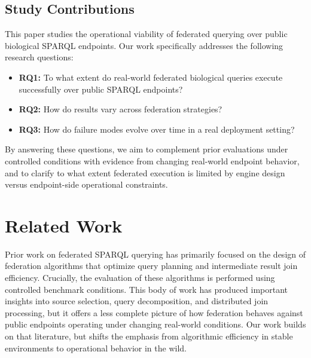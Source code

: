 \documentclass[runningheads]{llncs}
\begin{document}
\subsection{Study Contributions}\label{sec1.3}
This paper studies the operational viability of federated querying over public biological SPARQL endpoints. 
Our work specifically addresses the following research questions:

\begin{itemize}
    \item \textbf{RQ1:} To what extent do real-world federated biological queries execute successfully over public SPARQL endpoints?
    \item \textbf{RQ2:} How do results vary across federation strategies?
    \item \textbf{RQ3:} How do failure modes evolve over time in a real deployment setting?
\end{itemize}

By answering these questions, we aim to complement prior evaluations under controlled conditions with evidence from changing real-world endpoint behavior, and to clarify to what extent federated execution is limited by engine design versus endpoint-side operational constraints.


\section{Related Work}\label{sec2}
Prior work on federated SPARQL querying has primarily focused on the design of federation algorithms that optimize query planning and intermediate result join efficiency.
Crucially, the evaluation of these algorithms is performed using controlled benchmark conditions. 
This body of work has produced important insights into source selection, query decomposition, and distributed join processing, but it offers a less complete picture of how federation behaves against public endpoints operating under changing real-world conditions. 
Our work builds on that literature, but shifts the emphasis from algorithmic efficiency in stable environments to operational behavior in the wild.
\end{document}
